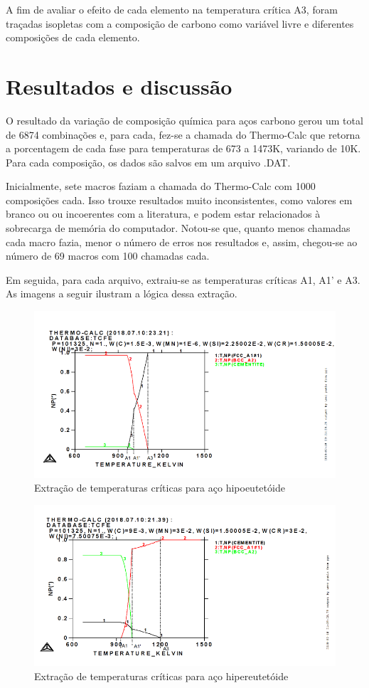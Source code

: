 \documentclass[brazil,tese,epusp]{usp}
\begin{document}
A fim de avaliar o efeito de cada elemento na temperatura crítica A3, foram traçadas isopletas com a composição de carbono como variável livre e diferentes composições de cada elemento.


\chapter{Resultados e discussão}

O resultado da variação de composição química para aços carbono gerou um total de 6874 combinações e, para cada, fez-se a chamada do Thermo-Calc\textregistered{} que retorna a porcentagem de cada fase para temperaturas de 673 a 1473K, variando de 10K. Para cada composição, os dados são salvos em um arquivo .DAT.

Inicialmente, sete macros faziam a chamada do Thermo-Calc\textregistered{} com 1000 composições cada. Isso trouxe resultados muito inconsistentes, como valores em branco ou ou incoerentes com a literatura, e podem estar relacionados à sobrecarga de memória do computador. Notou-se que, quanto menos chamadas cada macro fazia, menor o número de erros nos resultados e, assim, chegou-se ao número de 69 macros com 100 chamadas cada.

Em seguida, para cada arquivo, extraiu-se as temperaturas críticas A1, A1' e A3. As imagens a seguir ilustram a lógica dessa extração.

\begin{figure}
  \includegraphics[width=.9\textwidth]{img/714editado.png}
  \caption{Extração de temperaturas críticas para aço hipoeutetóide}
  \label{fig:Tcrit_liga_hipo}
\end{figure}

\begin{figure}
  \includegraphics[width=.9\textwidth]{img/4321editado.png}
  \caption{Extração de temperaturas críticas para aço hipereutetóide}
  \label{fig:Tcrit_liga_hiper}
\end{figure}
\end{document}
